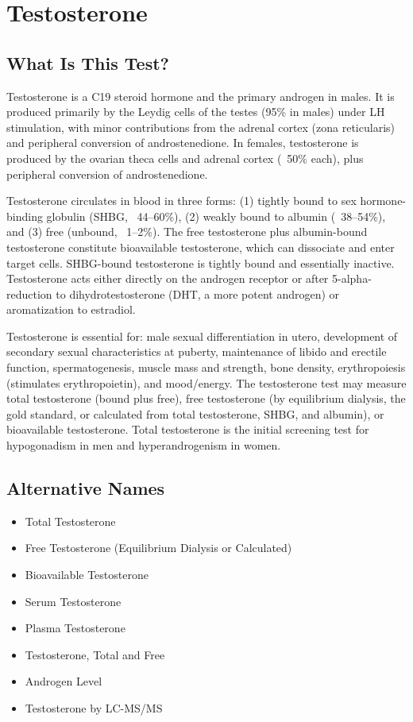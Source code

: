 \chapter{Testosterone}

\section*{What Is This Test?}
Testosterone is a C19 steroid hormone and the primary androgen in males. It is produced primarily by the Leydig cells of the testes (95\% in males) under LH stimulation, with minor contributions from the adrenal cortex (zona reticularis) and peripheral conversion of androstenedione. In females, testosterone is produced by the ovarian theca cells and adrenal cortex (~50\% each), plus peripheral conversion of androstenedione.

Testosterone circulates in blood in three forms: (1) tightly bound to sex hormone-binding globulin (SHBG, ~44--60\%), (2) weakly bound to albumin (~38--54\%), and (3) free (unbound, ~1--2\%). The free testosterone plus albumin-bound testosterone constitute bioavailable testosterone, which can dissociate and enter target cells. SHBG-bound testosterone is tightly bound and essentially inactive. Testosterone acts either directly on the androgen receptor or after 5-alpha-reduction to dihydrotestosterone (DHT, a more potent androgen) or aromatization to estradiol.

Testosterone is essential for: male sexual differentiation in utero, development of secondary sexual characteristics at puberty, maintenance of libido and erectile function, spermatogenesis, muscle mass and strength, bone density, erythropoiesis (stimulates erythropoietin), and mood/energy. The testosterone test may measure total testosterone (bound plus free), free testosterone (by equilibrium dialysis, the gold standard, or calculated from total testosterone, SHBG, and albumin), or bioavailable testosterone. Total testosterone is the initial screening test for hypogonadism in men and hyperandrogenism in women.

\section*{Alternative Names}
\begin{itemize}
  \item Total Testosterone
  \item Free Testosterone (Equilibrium Dialysis or Calculated)
  \item Bioavailable Testosterone
  \item Serum Testosterone
  \item Plasma Testosterone
  \item Testosterone, Total and Free
  \item Androgen Level
  \item Testosterone by LC-MS/MS
\end{itemize}
